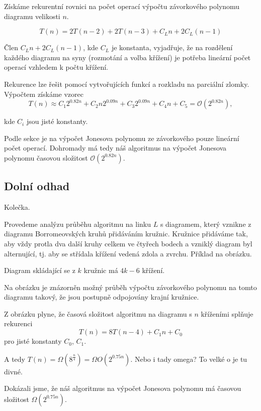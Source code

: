 Získáme rekurentní rovnici na počet operací výpočtu závorkového polynomu diagramu velikosti $n$.

$$T(n) = 2 T(n-2) + 2 T(n-3) + C_L n + 2 C_L (n-1)$$

Člen $C_L n + 2 C_L (n-1)$, kde $C_L$ je konstanta, vyjadřuje, že na rozdělení každého diagramu na syny (rozmotání a volba křížení) je potřeba lineární počet operací vzhledem k počtu křížení.

Rekurence lze řešit pomocí vytvořujících funkcí a rozkladu na parciální zlomky. Výpočtem získáme vzorec
$$ T(n) \approx C_1 2^{0.82 n } + C_2 n 2^{0.09 n } + C_3 2^{0.09 n } + C_4 n + C_5 = \mathcal{O}( 2^{0.82 n }),  $$

kde $C_i$ jsou jisté konstanty.

Podle sekce je na výpočet Jonesova polynomu ze závorkového pouze lineární počet operací. Dohromady má tedy náš algoritmus na výpočet Jonesova polynomu časovou složitost $\mathcal{O}( 2^{0.82 n })$.

\subsection{Dolní odhad}
Kolečka.

Provedeme analýzu průběhu algoritmu na linku $L$ s diagramem, který vznikne z diagramu Borromeovských kruhů přidáváním kružnic. Kružnice přidáváme tak, aby vždy protla dva další kruhy celkem ve čtyřech bodech a vzniklý diagram byl alternující, tj. aby se střídala křížení vedená zdola a zvrchu. Příklad na obrázku.

Diagram skládající se z $k$ kružnic má $4k-6$ křížení.

Na obrázku je znázorněn možný průběh výpočtu závorkového polynomu na tomto diagramu takový, že jsou postupně odpojovány krajní kružnice. 

Z obrázku plyne, že časová složitost algoritmu na diagramu s $n$ kříženími splňuje rekurenci
$$ T(n) = 8T(n-4) + C_1 n + C_0  $$
pro jisté konstanty $C_0$, $C_1$.

A tedy $T(n) = \Omega(8^{\frac{n}{4}})  =  \Omega{O}(2^{0.75 n})$. Nebo i tady omega? To velké o je tu divné.

Dokázali jsme, že náš algoritmus na výpočet Jonesova polynomu má časovou složitost $\Omega(2^{0.75n})$.

